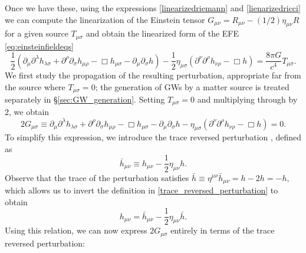  Once we have these, using the expressions \eqref{linearizedriemann} and \eqref{lienarizedricci} we can compute the linearization of the  Einstein tensor $G_{\mu \nu}=R_{\mu \nu}-(1/2)\eta_{\mu \nu}R$ for a given source
 $T_{\mu \sigma}$ and obtain the linearized form of the EFE \eqref{eq:einsteinfieldeqs}
\begin{equation}
\frac{1}{2} \left(\partial_\mu \partial^{\lambda} h_{\lambda \sigma} + \partial^{\rho} \partial_{\sigma} h_{\mu \rho}
- \Box h_{\mu \sigma} 
- \partial_{\mu} \partial_{\sigma} h \right) - \frac{1}{2} \eta_{\mu \sigma} \left( \partial^{\nu} \partial^{\rho} h_{\nu\rho} - \Box h \right) = \frac{8\pi G}{c^4} T_{\mu \sigma}.
\end{equation}
We first study the propagation of the resulting perturbation, appropriate far from the source where $T_{\mu \sigma} = 0$; the generation of GWs by a matter source is treated separately in \S\ref{sec:GW_generation}. Setting $T_{\mu \sigma} = 0$ and multiplying through by $2$, we obtain
\begin{equation}
2G_{\mu \sigma} \equiv \partial_\mu \partial^{\lambda} h_{\lambda \sigma} + \partial^{\rho} \partial_{\sigma} h_{\mu \rho}
- \Box h_{\mu \sigma} 
- \partial_{\mu} \partial_{\sigma} h  - \eta_{\mu \sigma} \left(\partial^{\nu} \partial^{\rho} h_{\nu\rho} - \Box h \right) = 0.
\end{equation}
To simplify this expression, we introduce the trace reversed perturbation \cite{maggiore2007gravitational}, defined as
 \begin{equation}
    \bar{h}_{\mu\nu} \equiv h_{\mu\nu} - \frac{1}{2}\eta_{\mu\nu}h.
    \label{trace_reversed_perturbation}
 \end{equation}
Observe that the trace of the perturbation satisfies $\bar{h} \equiv \eta^{\mu\nu}\bar{h}_{\mu\nu} = h - 2h = -h$, which allows us to invert the definition in \eqref{trace_reversed_perturbation} to obtain
\begin{equation}
    h_{\mu\nu} = \bar{h}_{\mu\nu} - \frac{1}{2}\eta_{\mu\nu}\bar{h}. 
\end{equation}
Using this relation, we can now express $2G_{\mu\sigma}$ entirely in terms of the trace reversed perturbation:
